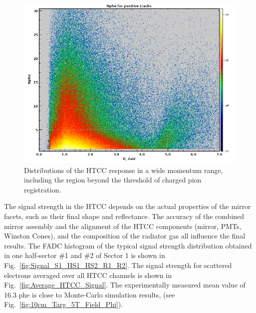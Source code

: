 \begin{figure}[!ht]
    \centering
    \includegraphics[width=1.0\linewidth,trim={0.0cm 0.0cm 0.0cm 0.0cm},clip]{images/positivePNPEC6595.png}
    \caption{Distributions of the HTCC response in a wide momentum range, including the region beyond the threshold of charged pion registration.}
    \label{fig:positivePNPEC6595}
\end{figure}

The signal strength in the HTCC depends on the actual properties of the mirror facets, such as their final shape and reflectance. The accuracy of the combined mirror assembly and the alignment of the HTCC components (mirror, PMTs, Winston Cones), and the composition of the radiator gas all influence the final results. The FADC histogram of  the typical signal strength distribution obtained in one half-sector \#1 and \#2 of Sector 1 is shown in Fig.~\ref{fig:Signal_S1_HS1_HS2_R1_R2}. The signal strength for scattered electrons averaged over all HTCC channels is shown in Fig.~\ref{fig:Average_HTCC_Signal}. The experimentally measured mean value of 16.3 phe is close to Monte-Carlo simulation results, (see Fig.~\ref{fig:10cm_Targ_5T_Field_Phi}).

